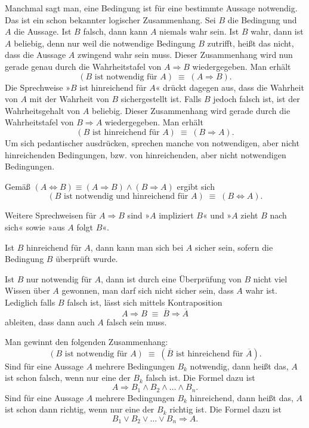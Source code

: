 Manchmal sagt man, eine Bedingung ist für eine bestimmte Aussage
notwendig. Das ist ein schon bekannter logischer Zusammenhang.
Sei $B$ die Bedingung und $A$ die Aussage. Ist $B$ falsch, dann
kann $A$ niemals wahr sein. Ist $B$ wahr, dann ist $A$ beliebig,
denn nur weil die notwendige Bedingung $B$ zutrifft, heißt das nicht,
dass die Aussage $A$ zwingend wahr sein muss. Dieser Zusammenhang
wird nun gerade genau durch die Wahrheitstafel von $A\Rightarrow B$
wiedergegeben. Man erhält%
\[(\text{$B$ ist notwendig für $A$})\;\equiv\; (A\Rightarrow B).\]
Die Sprechweise »$B$ ist hinreichend für $A$« drückt dagegen aus,
dass die Wahrheit von $A$ mit der Wahrheit von $B$ sichergestellt
ist. Falls $B$ jedoch falsch ist, ist der Wahrheitsgehalt von $A$
beliebig. Dieser Zusammenhang wird gerade durch die Wahrheitstafel
von $B\Rightarrow A$ wiedergegeben. Man erhält%
\[(\text{$B$ ist hinreichend für $A$})\;\equiv\; (B\Rightarrow A).\]
Um sich pedantischer ausdrücken, sprechen manche von notwendigen,
aber nicht hinreichenden Bedingungen, bzw. von hinreichenden,
aber nicht notwendigen Bedingungen. 

Gemäß
$(A\Leftrightarrow B)\equiv (A\Rightarrow B)\land (B\Rightarrow A)$
ergibt sich
\[(\text{$B$ ist notwendig und hinreichend für $A$})\;\equiv\;(B\Leftrightarrow A).\]

\noindent
Weitere Sprechweisen für $A\Rightarrow B$ sind »$A$ impliziert $B$«
und »$A$ zieht $B$ nach sich« sowie »aus $A$ folgt $B$«.

Ist $B$ hinreichend für $A$, dann kann man sich bei $A$ sicher sein,
sofern die Bedingung $B$ überprüft wurde.

Ist $B$ nur notwendig für $A$, dann ist durch eine Überprüfung von $B$
nicht viel Wissen über $A$ gewonnen, man darf sich nicht sicher sein,
dass $A$ wahr ist. Lediglich falls $B$ falsch
ist, lässt sich mittels Kontraposition%
\[A\Rightarrow B\;\equiv\;\overline B\Rightarrow\overline A\]
ableiten, dass dann auch $A$ falsch sein muss.

Man gewinnt den folgenden Zusammenhang:
\[(\text{$B$ ist notwendig für $A$})\;\equiv\;
(\text{$\overline B$ ist hinreichend für $\overline A$}).\]
Sind für eine Aussage $A$ mehrere Bedingungen $B_k$ notwendig,
dann heißt das, $A$ ist schon falsch, wenn nur eine der $B_k$
falsch ist. Die Formel dazu ist
\[A\Rightarrow B_1\land B_2\land\ldots\land B_n.\]
Sind für eine Aussage $A$ mehrere Bedingungen $B_k$ hinreichend,
dann heißt das, $A$ ist schon dann richtig, wenn nur eine der $B_k$
richtig ist. Die Formel dazu ist
\[B_1\lor B_2\lor\ldots\lor B_n\Rightarrow A.\]

